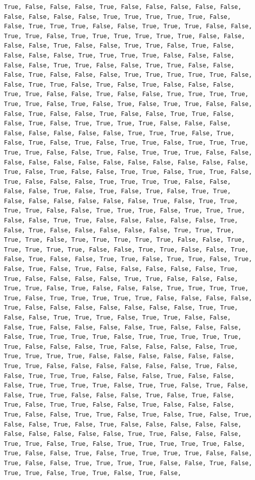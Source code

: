 \documentclass[
  letterpaper,
  DIV=11,
  numbers=noendperiod]{scrartcl}
\begin{document}
\begin{verbatim}
True, False, False, False, True, False, False, False, False, False, False, False, False, False, True, True, True, True, True, False, False, True, True, True, False, False, True, True, True, False, False, True, True, False, True, True, True, True, True, True, False, False, False, False, True, False, False, True, True, False, True, False, False, False, False, True, True, True, True, False, False, False, False, False, True, True, False, False, True, True, False, False, False, True, False, False, False, True, True, True, True, True, False, False, True, True, False, True, False, True, False, False, False, True, True, False, False, True, False, False, True, True, True, True, True, True, False, True, False, True, False, True, True, False, False, False, True, False, False, True, False, False, True, True, False, False, True, False, True, True, True, True, False, False, False, False, False, False, False, False, True, True, True, False, True, False, True, False, True, False, True, True, False, True, True, True, True, True, False, False, True, False, True, True, True, False, False, False, False, False, False, False, False, False, False, False, False, True, False, True, False, False, True, True, False, True, True, False, True, False, False, False, True, True, True, True, False, False, False, False, True, False, True, False, True, False, True, True, False, False, False, False, False, False, True, False, True, True, True, True, False, False, True, True, True, False, True, True, True, False, False, True, True, False, False, False, False, False, True, False, True, False, False, False, False, False, True, True, True, True, True, False, True, True, True, True, True, False, False, True, True, True, True, True, False, False, True, True, False, False, True, False, True, False, False, True, True, False, True, True, False, True, False, True, False, True, False, False, False, False, False, True, True, False, False, False, False, True, True, False, False, False, True, True, False, True, False, False, False, True, True, True, True, True, False, True, True, True, True, True, False, False, False, False, True, False, False, False, False, False, False, False, True, True, False, False, True, True, True, False, True, True, False, False, False, True, False, False, False, False, True, False, False, False, False, True, True, True, True, False, True, True, True, True, True, True, False, False, False, True, False, False, False, False, True, True, True, True, True, False, False, False, False, False, False, True, True, False, False, False, False, False, False, True, False, False, True, True, True, False, False, False, True, False, False, False, True, True, True, True, False, True, True, False, True, False, False, True, True, False, False, False, True, False, True, False, True, False, True, True, False, False, True, False, False, False, True, False, False, True, True, False, True, False, True, False, True, False, False, True, False, True, False, False, False, False, False, False, False, False, False, False, True, True, False, False, False, True, True, False, True, False, True, True, True, True, True, False, True, False, False, True, False, True, True, True, True, False, False, True, False, False, True, True, True, True, False, False, True, False, True, True, False, True, True, False, True, False, 
\end{verbatim}
\end{document}
